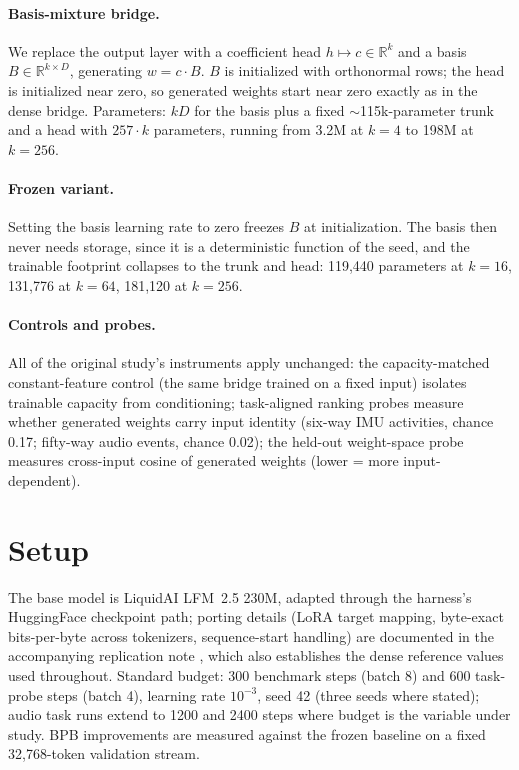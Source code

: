 \documentclass[11pt]{article}
\begin{document}
\paragraph{Basis-mixture bridge.}
We replace the output layer with a coefficient head $h \mapsto c \in \mathbb{R}^k$ and a basis $B \in \mathbb{R}^{k \times D}$, generating $w = c \cdot B$. $B$ is initialized with orthonormal rows; the head is initialized near zero, so generated weights start near zero exactly as in the dense bridge. Parameters: $kD$ for the basis plus a fixed $\sim$115k-parameter trunk and a head with $257 \cdot k$ parameters, running from 3.2M at $k{=}4$ to 198M at $k{=}256$.

\paragraph{Frozen variant.}
Setting the basis learning rate to zero freezes $B$ at initialization. The basis then never needs storage, since it is a deterministic function of the seed, and the trainable footprint collapses to the trunk and head: 119,440 parameters at $k{=}16$, 131,776 at $k{=}64$, 181,120 at $k{=}256$.

\paragraph{Controls and probes.}
All of the original study's instruments apply unchanged: the capacity-matched constant-feature control (the same bridge trained on a fixed input) isolates trainable capacity from conditioning; task-aligned ranking probes measure whether generated weights carry input identity (six-way IMU activities, chance 0.17; fifty-way audio events, chance 0.02); the held-out weight-space probe measures cross-input cosine of generated weights (lower = more input-dependent).

\section{Setup}
The base model is LiquidAI LFM~2.5 230M, adapted through the harness's HuggingFace checkpoint path; porting details (LoRA target mapping, byte-exact bits-per-byte across tokenizers, sequence-start handling) are documented in the accompanying replication note \cite{penov2026note}, which also establishes the dense reference values used throughout. Standard budget: 300 benchmark steps (batch 8) and 600 task-probe steps (batch 4), learning rate $10^{-3}$, seed 42 (three seeds where stated); audio task runs extend to 1200 and 2400 steps where budget is the variable under study. BPB improvements are measured against the frozen baseline on a fixed 32{,}768-token validation stream.
\end{document}
